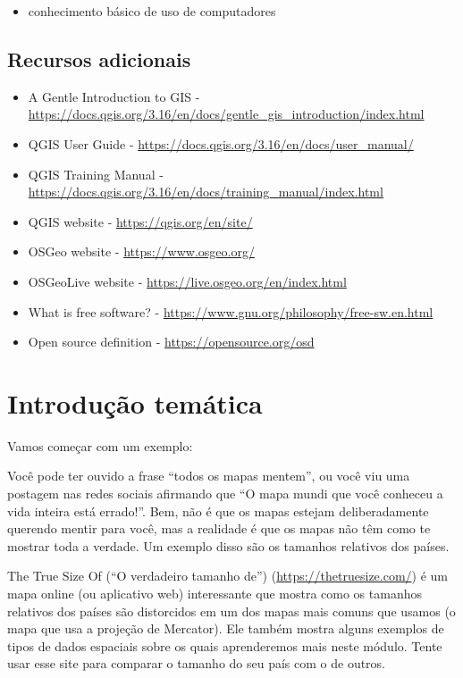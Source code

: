 \documentclass[
  portuguese,
]{krantz}
\providecommand{\tightlist}{%
  \setlength{\itemsep}{0pt}\setlength{\parskip}{0pt}}
\begin{document}
\begin{itemize}
\tightlist
\item
  conhecimento básico de uso de computadores
\end{itemize}

\hypertarget{recursos-adicionais}{%
\subsection{Recursos adicionais}\label{recursos-adicionais}}

\begin{itemize}
\tightlist
\item
  A Gentle Introduction to GIS - \url{https://docs.qgis.org/3.16/en/docs/gentle_gis_introduction/index.html}
\item
  QGIS User Guide - \url{https://docs.qgis.org/3.16/en/docs/user_manual/}
\item
  QGIS Training Manual - \url{https://docs.qgis.org/3.16/en/docs/training_manual/index.html}
\item
  QGIS website - \url{https://qgis.org/en/site/}
\item
  OSGeo website - \url{https://www.osgeo.org/}
\item
  OSGeoLive website - \url{https://live.osgeo.org/en/index.html}
\item
  What is free software? - \url{https://www.gnu.org/philosophy/free-sw.en.html}
\item
  Open source definition - \url{https://opensource.org/osd}
\end{itemize}

\hypertarget{introduuxe7uxe3o-temuxe1tica}{%
\section{Introdução temática}\label{introduuxe7uxe3o-temuxe1tica}}

Vamos começar com um exemplo:

Você pode ter ouvido a frase ``todos os mapas mentem'', ou você viu uma postagem nas redes sociais afirmando que ``O mapa mundi que você conheceu a vida inteira está errado!''. Bem, não é que os mapas estejam deliberadamente querendo mentir para você, mas a realidade é que os mapas não têm como te mostrar toda a verdade. Um exemplo disso são os tamanhos relativos dos países.

The True Size Of (``O verdadeiro tamanho de'') (\url{https://thetruesize.com/}) é um mapa online (ou aplicativo web) interessante que mostra como os tamanhos relativos dos países são distorcidos em um dos mapas mais comuns que usamos (o mapa que usa a projeção de Mercator). Ele também mostra alguns exemplos de tipos de dados espaciais sobre os quais aprenderemos mais neste módulo. Tente usar esse site para comparar o tamanho do seu país com o de outros.
\end{document}
